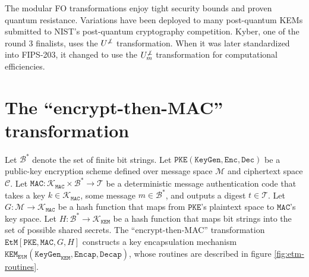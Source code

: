 \documentclass[journal=tches,submission]{iacrtrans}
\newcommand{\pke}{\texttt{PKE}}
\newcommand{\keygen}{\texttt{KeyGen}}
\newcommand{\encrypt}{\texttt{Enc}}
\newcommand{\decrypt}{\texttt{Dec}}
\newcommand{\kem}{\texttt{KEM}}
\newcommand{\encap}{\texttt{Encap}}
\newcommand{\decap}{\texttt{Decap}}
\newcommand{\etm}{\texttt{EtM}}  %
\newcommand{\mac}{\texttt{MAC}}
\begin{document}
The modular FO transformations enjoy tight security bounds and proven quantum resistance. Variations have been deployed to many post-quantum KEMs submitted to NIST's post-quantum cryptography competition. Kyber, one of the round 3 finalists, uses the $U^{\not\bot}$ transformation. When it was later standardized into FIPS-203, it changed to use the $U^{\not\bot}_m$ transformation for computational efficiencies.

\section{The ``encrypt-then-MAC'' transformation}\label{sec:main-results}
Let $\mathcal{B}^\ast$ denote the set of finite bit strings. Let $\pke(\keygen, \encrypt, \decrypt)$ be a public-key encryption scheme defined over message space $\mathcal{M}$ and ciphertext space $\mathcal{C}$. Let $\mac: \mathcal{K}_\mac \times \mathcal{B}^\ast \rightarrow \mathcal{T}$ be a deterministic message authentication code that takes a key $k \in \mathcal{K}_\mac$, some message $m \in \mathcal{B}^\ast$, and outputs a digest $t \in \mathcal{T}$. Let $G: \mathcal{M} \rightarrow \mathcal{K}_\mac$ be a hash function that maps from $\pke$'s plaintext space to $\mac$'s key space. Let $H: \mathcal{B}^\ast \rightarrow \mathcal{K}_\kem$ be a hash function that maps bit strings into the set of possible shared secrets. The ``encrypt-then-MAC'' transformation $\etm[\pke, \mac, G, H]$ constructs a key encapsulation mechanism $\kem_\etm(\keygen_\kem, \encap, \decap)$, whose routines are described in figure \ref{fig:etm-routines}.
\end{document}
